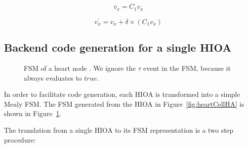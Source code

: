 \begin{equation}
  \dot{v_x} = C_{1} v_x
  \label{eq:ode}
\end{equation}

\begin{equation}
  v^\prime_x = v_x + \delta \times (C_{1} v_x)
  \label{eq:euler_equiv}
\end{equation}

\setlength{\belowdisplayskip}{\baselineskip} 
\setlength{\belowdisplayshortskip}{\baselineskip}
\setlength{\abovedisplayskip}{\baselineskip} 
\setlength{\abovedisplayshortskip}{\baselineskip}


\subsection{Backend code generation for a single \ac{HIOA}}
\label{sec:backendCodeGeneration}

\begin{figure}
  \centering 
  \caption{\acf{FSM} of a heart node \label{fig:heartCellFSM}. We ignore
    the $\tau$ event in the \ac{FSM}, because it always evaluates to
    $true$.}
\end{figure}

In order to facilitate code generation, each \ac{HIOA} is transformed
into a simple Mealy \ac{FSM}. The \ac{FSM} generated from the \ac{HIOA}
in Figure~\ref{fig:heartCellHA} is shown in
Figure~\ref{fig:heartCellFSM}.

The translation from a single \ac{HIOA} to its \ac{FSM} representation
is a two step procedure:

